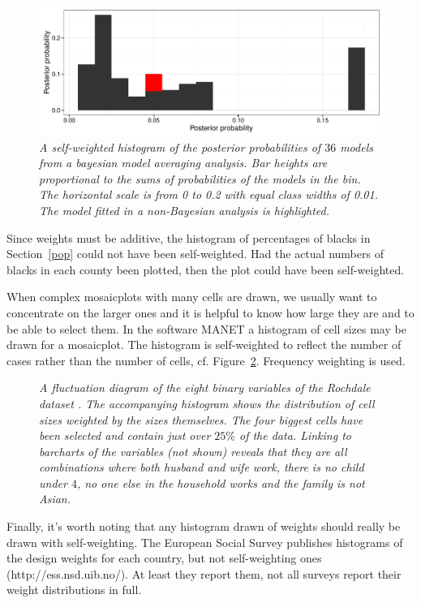 \documentclass{svmult}
\begin{document}
\begin{figure}[htbp]
  \centering
  \includegraphics[width=\linewidth]{post-prob}
  \caption{\em A self-weighted histogram of the posterior probabilities of $36$ models from a bayesian model averaging analysis.  Bar heights are proportional to the sums of probabilities of the models in the bin.  The horizontal scale is from 0 to 0.2 with equal class widths of 0.01.  The model fitted in a non-Bayesian analysis is highlighted.}
  \label{uvw}
\end{figure} 

Since weights must be additive, the histogram of percentages of blacks in Section~\ref{pop} could not have been self-weighted.  Had the actual numbers of blacks in each county been plotted, then the plot could have been self-weighted.

When complex mosaicplots with many cells are drawn, we usually want to concentrate on the larger ones and it is helpful to know how large they are and to be able to select them.  In the software MANET \citep{unwin:1996} a histogram of cell sizes may be drawn for a mosaicplot.  The histogram is self-weighted to reflect the number of cases rather than the number of cells, cf. Figure~\ref{binmosaic}. Frequency weighting is used.


\begin{figure}[htbp]
  \centering
  \caption{\label{binmosaic}\em A fluctuation diagram of the eight binary variables of the Rochdale dataset \citep{whittaker:1990}.   The accompanying histogram shows the distribution of cell sizes weighted by the sizes themselves.  The four biggest cells have been selected and contain just over $25\%$ of the data.  Linking to barcharts of the variables (not shown) reveals that they are all combinations where both husband and wife work, there is no child under $4$, no one else in the household works and the family is not Asian.}
\end{figure}

Finally, it's worth noting that any histogram drawn of weights should really be drawn with self-weighting.  The European Social Survey publishes histograms of the design weights for each country, but not self-weighting ones (http://ess.nsd.uib.no/).  At least they report them, not all surveys report their weight distributions in full.
\newpage
\end{document}
